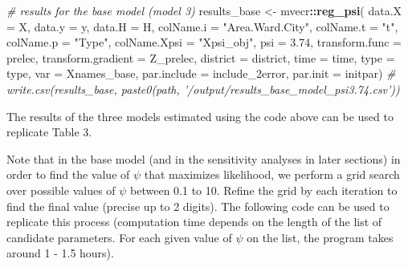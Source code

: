 \documentclass[
]{article}
\newenvironment{Shaded}{\begin{snugshade}}{\end{snugshade}}
\newcommand{\CommentTok}[1]{\textcolor[rgb]{0.56,0.35,0.01}{\textit{#1}}}
\newcommand{\DataTypeTok}[1]{\textcolor[rgb]{0.13,0.29,0.53}{#1}}
\newcommand{\FloatTok}[1]{\textcolor[rgb]{0.00,0.00,0.81}{#1}}
\newcommand{\KeywordTok}[1]{\textcolor[rgb]{0.13,0.29,0.53}{\textbf{#1}}}
\newcommand{\NormalTok}[1]{#1}
\newcommand{\OperatorTok}[1]{\textcolor[rgb]{0.81,0.36,0.00}{\textbf{#1}}}
\newcommand{\StringTok}[1]{\textcolor[rgb]{0.31,0.60,0.02}{#1}}
\begin{document}
\begin{Shaded}
\begin{Highlighting}[]
\CommentTok{# results for the base model (model 3)}
\NormalTok{results_base <-}\StringTok{ }\NormalTok{mvecr}\OperatorTok{::}\KeywordTok{reg_psi}\NormalTok{(}
  \DataTypeTok{data.X =}\NormalTok{ X, }\DataTypeTok{data.y =}\NormalTok{ y, }\DataTypeTok{data.H =}\NormalTok{ H,}
  \DataTypeTok{colName.i =} \StringTok{"Area.Ward.City"}\NormalTok{, }\DataTypeTok{colName.t =} \StringTok{"t"}\NormalTok{, }
  \DataTypeTok{colName.p =} \StringTok{"Type"}\NormalTok{, }\DataTypeTok{colName.Xpsi =} \StringTok{"Xpsi_obj"}\NormalTok{,}
  \DataTypeTok{psi =} \FloatTok{3.74}\NormalTok{, }
  \DataTypeTok{transform.func =}\NormalTok{ prelec, }\DataTypeTok{transform.gradient =}\NormalTok{ Z_prelec,}
  \DataTypeTok{district =}\NormalTok{ district, }\DataTypeTok{time =}\NormalTok{ time, }\DataTypeTok{type =}\NormalTok{ type,}
  \DataTypeTok{var =}\NormalTok{ Xnames_base,}
  \DataTypeTok{par.include =}\NormalTok{ include_2error,}
  \DataTypeTok{par.init =}\NormalTok{ initpar)}
\CommentTok{# write.csv(results_base, paste0(path, '/output/results_base_model_psi3.74.csv'))}
\end{Highlighting}
\end{Shaded}

The results of the three models estimated using the code above can be
used to replicate Table 3.

Note that in the base model (and in the sensitivity analyses in later
sections) in order to find the value of \(\psi\) that maximizes
likelihood, we perform a grid search over possible values of \(\psi\)
between 0.1 to 10. Refine the grid by each iteration to find the final
value (precise up to 2 digits). The following code can be used to
replicate this process (computation time depends on the length of the
list of candidate parameters. For each given value of \(\psi\) on the
list, the program takes around 1 - 1.5 hours).
\end{document}
